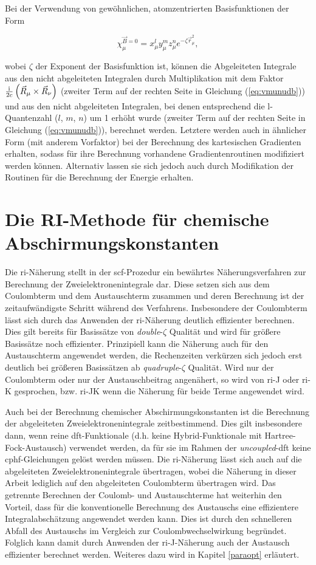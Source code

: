 Bei der Verwendung von gewöhnlichen, atomzentrierten Basisfunktionen der Form

\begin{equation}
\chi_\mu^{\vec{B}=0}=x_\mu^l y_\mu^m z_\mu^n e^{-\zeta\vec{r}_\mu^2},
\end{equation}

wobei $\zeta$ der Exponent der Basisfunktion ist, können die Abgeleiteten Integrale aus den nicht abgeleiteten Integralen durch Multiplikation mit dem Faktor $\frac{\mathrm{i}\mkern1mu}{2c}\left(\vec{R}_\mu\times\vec{R}_\nu\right)$ (zweiter Term auf der rechten Seite in Gleichung (\ref{eq:vmunudb})) und aus den nicht abgeleiteten Integralen, bei denen entsprechend die l-Quantenzahl ($l$, $m$, $n$) um 1 erhöht wurde (zweiter Term auf der rechten Seite in Gleichung (\ref{eq:vmunudb})), berechnet werden. Letztere werden auch in ähnlicher Form (mit anderem Vorfaktor) bei der Berechnung des kartesischen Gradienten erhalten, sodass für ihre Berechnung vorhandene Gradientenroutinen modifiziert werden können. Alternativ lassen sie sich jedoch auch durch Modifikation der Routinen für die Berechnung der Energie erhalten. 

\section{Die RI-Methode für chemische Abschirmungskonstanten}\label{ri}
Die \ac{ri}-Näherung stellt in der \ac{scf}-Prozedur ein bewährtes Näherungsverfahren zur Berechnung der Zweielektronenintegrale dar. Diese setzen sich aus dem Coulombterm und dem Austauschterm zusammen und deren Berechnung ist der zeitaufwändigste Schritt während des Verfahrens. Insbesondere der Coulombterm lässt sich durch das Anwenden der \ac{ri}-Näherung deutlich effizienter berechnen. Dies gilt bereits für Basissätze von \textit{double}-$\zeta$ Qualität und wird für größere Basissätze noch effizienter. Prinzipiell kann die Näherung auch für den Austauschterm angewendet werden, die Rechenzeiten verkürzen sich jedoch erst deutlich bei größeren Basissätzen ab \textit{quadruple}-$\zeta$ Qualität. Wird nur der Coulombterm oder nur der Austauschbeitrag angenähert, so wird von \ac{ri}-J oder \ac{ri}-K gesprochen, bzw. \ac{ri}-JK wenn die Näherung für beide Terme angewendet wird. 

Auch bei der Berechnung chemischer Abschirmungskonstanten ist die Berechnung der abgeleiteten Zweielektronenintegrale zeitbestimmend. Dies gilt insbesondere dann, wenn reine \ac{dft}-Funktionale (d.h. keine Hybrid-Funktionale mit Hartree-Fock-Austausch) verwendet werden, da für sie im Rahmen der \textit{uncoupled}-\ac{dft} keine \ac{cphf}-Gleichungen gelöst werden müssen. Die \ac{ri}-Näherung lässt sich auch auf die abgeleiteten Zweielektronenintegrale übertragen, wobei die Näherung in dieser Arbeit lediglich auf den abgeleiteten Coulombterm übertragen wird. Das getrennte Berechnen der Coulomb- und Austauschterme hat weiterhin den Vorteil, dass für die konventionelle Berechnung des Austauschs eine effizientere Integralabschätzung angewendet werden kann. Dies ist durch den schnelleren Abfall des Austauschs im Vergleich zur Coulombwechselwirkung begründet. Folglich kann damit durch Anwenden der \ac{ri}-J-Näherung auch der Austausch effizienter berechnet werden. Weiteres dazu wird in Kapitel \ref{paraopt} erläutert. 
